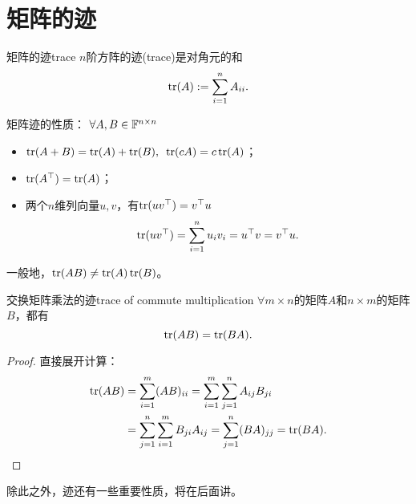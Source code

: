 \section{矩阵的迹}
\begin{definition}{矩阵的迹}{trace}
	$n$阶方阵的迹(trace)是对角元的和
	\begin{equation}
		\operatorname{tr}(A):=\sum_{i=1}^nA_{ii}.
	\end{equation}
\end{definition}
\begin{corollary}
	矩阵迹的性质：%
	$\forall A,B\in\mathbb F^{n\times n}$
    \begin{itemize}
    	\item $\operatorname{tr}(A+B)=\operatorname{tr}(A)+\operatorname{tr}(B),\enspace \operatorname{tr}(cA)=c\operatorname{tr}(A)$；
    	\item $\operatorname{tr}(A^\top)=\operatorname{tr}(A)$；
    	\item 两个$n$维列向量$u,v$，有$\operatorname{tr}(uv^\top)=v^\top u$
    	\[
    		\operatorname{tr}(uv^\top)=\sum_{i=1}^nu_iv_i=u^\top v=v^\top u.
    	\]
    \end{itemize}
\end{corollary}
\begin{remark}
	一般地，$\operatorname{tr}(AB)\neq\operatorname{tr}(A)\operatorname{tr}(B)$。
\end{remark}
\begin{theorem}{交换矩阵乘法的迹}{trace of commute multiplication}
	$\forall m\times n$的矩阵$A$和$n\times m$的矩阵$B$，都有
	\begin{equation}
		\operatorname{tr}(AB)=\operatorname{tr}(BA).
	\end{equation}
\end{theorem}
\begin{proof}
	直接展开计算：
	\begin{align*}
		\operatorname{tr}(AB)&=\sum_{i=1}^m(AB)_{ii}=\sum_{i=1}^m\sum_{j=1}^nA_{ij}B_{ji}\\
		&=\sum_{j=1}^n\sum_{i=1}^mB_{ji}A_{ij}=\sum_{j=1}^n(BA)_{jj}=\operatorname{tr}(BA).
		\qedhere
	\end{align*}
\end{proof}

\begin{remark}
	除此之外，迹还有一些重要性质，将在后面讲。
\end{remark}
